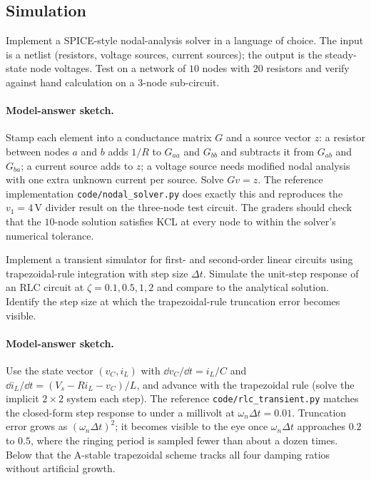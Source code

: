 \subsection*{Simulation}

\begin{exercise}
Implement a SPICE-style nodal-analysis solver in a language of choice.
The input is a netlist (resistors, voltage sources, current sources);
the output is the steady-state node voltages. Test on a network of
$10$ nodes with $20$ resistors and verify against hand calculation on
a $3$-node sub-circuit.
\paragraph{Model-answer sketch.}
Stamp each element into a conductance matrix $G$ and a source vector
$z$: a resistor between nodes $a$ and $b$ adds $1/R$ to $G_{aa}$ and
$G_{bb}$ and subtracts it from $G_{ab}$ and $G_{ba}$; a current source
adds to $z$; a voltage source needs modified nodal analysis with one
extra unknown current per source. Solve $Gv = z$. The reference
implementation \texttt{code/nodal\_solver.py} does exactly this and
reproduces the $v_{1} = 4\,\si{\volt}$ divider result on the
three-node test circuit. The graders should check that the
$10$-node solution satisfies KCL at every node to within the solver's
numerical tolerance.
\end{exercise}

\begin{exercise}
Implement a transient simulator for first- and second-order linear
circuits using trapezoidal-rule integration with step size $\Delta
t$. Simulate the unit-step response of an RLC circuit at $\zeta = 0.1,
0.5, 1, 2$ and compare to the analytical solution. Identify the step
size at which the trapezoidal-rule truncation error becomes visible.
\paragraph{Model-answer sketch.}
Use the state vector $(v_{C}, i_{L})$ with $\dd v_{C}/\dd t = i_{L}/C$
and $\dd i_{L}/\dd t = (V_{s}-Ri_{L}-v_{C})/L$, and advance with the
trapezoidal rule (solve the implicit $2\times 2$ system each step). The
reference \texttt{code/rlc\_transient.py} matches the closed-form step
response to under a millivolt at $\omega_{n}\Delta t = 0.01$. Truncation
error grows as $(\omega_{n}\Delta t)^{2}$; it becomes visible to the eye
once $\omega_{n}\Delta t$ approaches $0.2$ to $0.5$, where the ringing
period is sampled fewer than about a dozen times. Below that the
A-stable trapezoidal scheme tracks all four damping ratios without
artificial growth.
\end{exercise}

